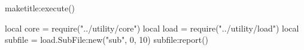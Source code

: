 \documentclass[11pt, a4paper]{ltjsreport}
\begin{document}
    \begin{luacode*}
        maketitle:execute()
    \end{luacode*}

    \tableofcontents

    \begin{luacode*}
        local core = require("../utility/core")
        local load = require("../utility/load")
        local subfile = load.SubFile:new("sub", 0, 10)
        subfile:report()
    \end{luacode*}

    
    
\end{document}
